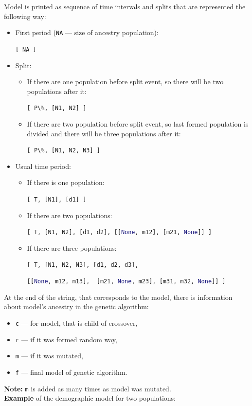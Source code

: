 \documentclass[12pt]{article}
\makeatletter
\newcommand{\py}[1]{\lstinline[language=Python, showstringspaces=False]@#1@}
\makeatother
\begin{document}
Model is printed as sequence of time intervals and splits that are represented the following way:

\begin{itemize}
    \item First period (\py{NA} --- size of ancestry population):

\py{[ NA ]}

    \item Split:
    \begin{itemize}
        \item If there are one population before split event, so there will be two populations after it:

\py{[ P\%, [N1, N2] ]}
        
    \item If there are two population before split event, so last formed population is divided and there will be three populations after it:

\py{[ P\%, [N1, N2, N3] ]}

    \end{itemize}
    \item Usual time period:
    \begin{itemize}
        \item If there is one population:

\py{[ T, [N1], [d1] ]}

        \item If there are two populations:

\py{[ T, [N1, N2], [d1, d2], [[None, m12], [m21, None]] ]}

        \item If there are three populations:

\py{[ T, [N1, N2, N3], [d1, d2, d3],}

\hspace{2cm} \py{[[None, m12, m13], 
[m21, None, m23], [m31, m32, None]] ]}

    \end{itemize}

\end{itemize}

At the end of the string, that corresponds to the model, there is information about model's ancestry in the genetic algorithm: 
\begin{itemize}
    \item \py{c} --- for model, that is child of crossover,
    \item \py{r} --- if it was formed random way,
    \item \py{m} --- if it was mutated,
    \item \py{f} --- final model of genetic algorithm.
\end{itemize} 
\textbf{Note: } \py{m} is added as many times as model was mutated.\\
\textbf{Example} of the demographic model for two populations:
\end{document}
